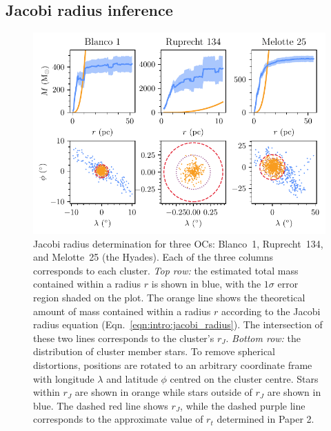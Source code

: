 \subsection{Jacobi radius inference}
\label{sec:dynamics:masses:jacobi}

\begin{figure}[t]
    \centering
    \includegraphics[width=\textwidth]{fig/c4/masses_jacobi_radii.pdf}
    \caption[Jacobi radius determination for three OCs: Blanco~1, Ruprecht~134, and Melotte~25]{Jacobi radius determination for three OCs: Blanco~1, Ruprecht~134, and Melotte~25 (the Hyades). Each of the three columns corresponds to each cluster. \emph{Top row:} the estimated total mass contained within a radius $r$ is shown in blue, with the $1\sigma$ error region shaded on the plot. The orange line shows the theoretical amount of mass contained within a radius $r$ according to the Jacobi radius equation (Eqn.~\ref{eqn:intro:jacobi_radius}). The intersection of these two lines corresponds to the cluster's $r_J$. \emph{Bottom row:} the distribution of cluster member stars. To remove spherical distortions, positions are rotated to an arbitrary coordinate frame with longitude $\lambda$ and latitude $\phi$ centred on the cluster centre. Stars within $r_J$ are shown in orange while stars outside of $r_J$ are shown in blue. The dashed red line shows $r_J$, while the dashed purple line corresponds to the approximate value of $r_t$ determined in Paper 2.}
    \label{fig:dynamics:masses:radii_examples}
\end{figure}

